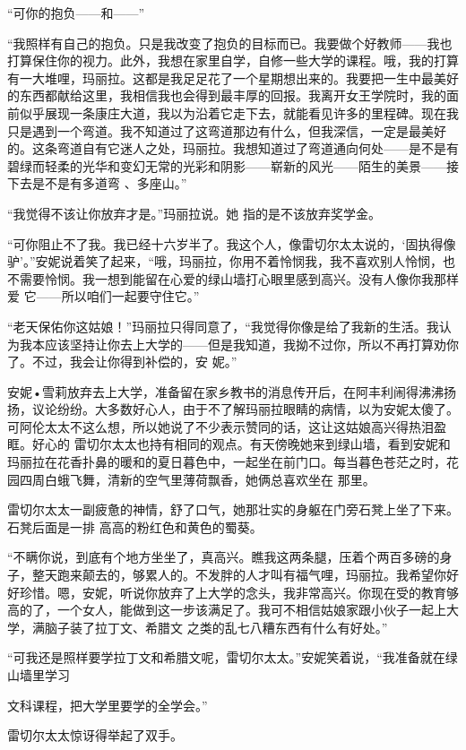 \documentclass{article}
\begin{document}
“可你的抱负——和——” 

“我照样有自己的抱负。只是我改变了抱负的目标而已。我要做个好教师——我也打算保住你的视力。此外，我想在家里自学，自修一些大学的课程。哦，我的打算有一大堆哩，玛丽拉。这都是我足足花了一个星期想出来的。我要把一生中最美好的东西都献给这里，我相信我也会得到最丰厚的回报。我离开女王学院时，我的面前似乎展现一条康庄大道，我以为沿着它走下去，就能看见许多的里程碑。现在我只是遇到一个弯道。我不知道过了这弯道那边有什么，但我深信，一定是最美好的。这条弯道自有它迷人之处，玛丽拉。我想知道过了弯道通向何处——是不是有碧绿而轻柔的光华和变幻无常的光彩和阴影——崭新的风光——陌生的美景——接下去是不是有多道弯
、多座山。” 

\newpage

“我觉得不该让你放弃才是。”玛丽拉说。她
指的是不该放弃奖学金。 

“可你阻止不了我。我已经十六岁半了。我这个人，像雷切尔太太说的，‘固执得像驴’。”安妮说着笑了起来，“哦，玛丽拉，你用不着怜悯我，我不喜欢别人怜悯，也不需要怜悯。我一想到能留在心爱的绿山墙打心眼里感到高兴。没有人像你我那样爱
它——所以咱们一起要守住它。” 

“老天保佑你这姑娘！”玛丽拉只得同意了，“我觉得你像是给了我新的生活。我认为我本应该坚持让你去上大学的——但是我知道，我拗不过你，所以不再打算劝你了。不过，我会让你得到补偿的，安
妮。” 

安妮•雪莉放弃去上大学，准备留在家乡教书的消息传开后，在阿丰利闹得沸沸扬扬，议论纷纷。大多数好心人，由于不了解玛丽拉眼睛的病情，以为安妮太傻了。可阿伦太太不这么想，所以她说了不少表示赞同的话，这让这姑娘高兴得热泪盈眶。好心的
\newpage
雷切尔太太也持有相同的观点。有天傍晚她来到绿山墙，看到安妮和玛丽拉在花香扑鼻的暖和的夏日暮色中，一起坐在前门口。每当暮色苍茫之时，花园四周白蛾飞舞，清新的空气里薄荷飘香，她俩总喜欢坐在
那里。 

雷切尔太太一副疲惫的神情，舒了口气，她那壮实的身躯在门旁石凳上坐了下来。石凳后面是一排
高高的粉红色和黄色的蜀葵。 

“不瞒你说，到底有个地方坐坐了，真高兴。瞧我这两条腿，压着个两百多磅的身子，整天跑来颠去的，够累人的。不发胖的人才叫有福气哩，玛丽拉。我希望你好好珍惜。嗯，安妮，听说你放弃了上大学的念头，我非常高兴。你现在受的教育够高的了，一个女人，能做到这一步该满足了。我可不相信姑娘家跟小伙子一起上大学，满脑子装了拉丁文、希腊文
之类的乱七八糟东西有什么有好处。” 

“可我还是照样要学拉丁文和希腊文呢，雷切尔太太。”安妮笑着说，“我准备就在绿山墙里学习
\newpage

文科课程，把大学里要学的全学会。” 


雷切尔太太惊讶得举起了双手。 
\end{document}
